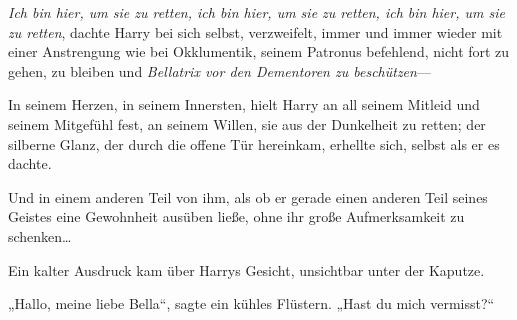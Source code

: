 \emph{Ich bin hier, um sie zu retten, ich bin hier, um sie zu retten, ich bin hier, um sie zu retten}, dachte Harry bei sich selbst, verzweifelt, immer und immer wieder mit einer Anstrengung wie bei Okklumentik, seinem Patronus befehlend, nicht fort zu gehen, zu bleiben und \emph{Bellatrix vor den Dementoren zu beschützen}—

In seinem Herzen, in seinem Innersten, hielt Harry an all seinem Mitleid und seinem Mitgefühl fest, an seinem Willen, sie aus der Dunkelheit zu retten; der silberne Glanz, der durch die offene Tür hereinkam, erhellte sich, selbst als er es dachte.

Und in einem anderen Teil von ihm, als ob er gerade einen anderen Teil seines Geistes eine Gewohnheit ausüben ließe, ohne ihr große Aufmerksamkeit zu schenken…

Ein kalter Ausdruck kam über Harrys Gesicht, unsichtbar unter der Kaputze.

„Hallo, meine liebe Bella“, sagte ein kühles Flüstern. „Hast du mich vermisst?“

